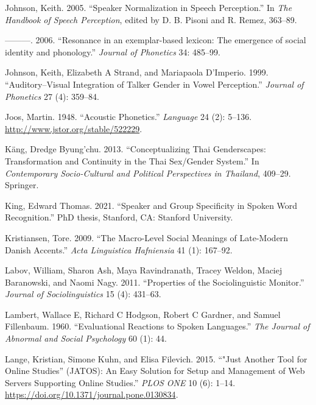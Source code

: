 \documentclass[
  letterpaper,
  DIV=11,
  numbers=noendperiod]{scrartcl}
\newlength{\cslhangindent}
\newenvironment{CSLReferences}[2] %
 {\begin{list}{}{%
  \setlength{\itemindent}{0pt}
  \setlength{\leftmargin}{0pt}
  \setlength{\parsep}{0pt}
  \ifodd #1
   \setlength{\leftmargin}{\cslhangindent}
   \setlength{\itemindent}{-1\cslhangindent}
  \fi
  \setlength{\itemsep}{#2\baselineskip}}}
 {\end{list}}
\begin{document}
\begin{CSLReferences}{1}{0}
Johnson, Keith. 2005. {``Speaker Normalization in Speech Perception.''}
In \emph{The Handbook of Speech Perception}, edited by D. B. Pisoni and
R. Remez, 363--89.

---------. 2006. {``{Resonance in an exemplar-based lexicon: The
emergence of social identity and phonology.}''} \emph{Journal of
Phonetics} 34: 485--99.

Johnson, Keith, Elizabeth A Strand, and Mariapaola D'Imperio. 1999.
{``Auditory--Visual Integration of Talker Gender in Vowel Perception.''}
\emph{Journal of Phonetics} 27 (4): 359--84.

Joos, Martin. 1948. {``Acoustic Phonetics.''} \emph{Language} 24 (2):
5--136. \url{http://www.jstor.org/stable/522229}.

Käng, Dredge Byung'chu. 2013. {``Conceptualizing Thai Genderscapes:
Transformation and Continuity in the Thai Sex/Gender System.''} In
\emph{Contemporary Socio-Cultural and Political Perspectives in
Thailand}, 409--29. Springer.

King, Edward Thomas. 2021. {``Speaker and Group Specificity in Spoken
Word Recognition.''} PhD thesis, Stanford, CA: Stanford University.

Kristiansen, Tore. 2009. {``The Macro-Level Social Meanings of
Late-Modern Danish Accents.''} \emph{Acta Linguistica Hafniensia} 41
(1): 167--92.

Labov, William, Sharon Ash, Maya Ravindranath, Tracey Weldon, Maciej
Baranowski, and Naomi Nagy. 2011. {``Properties of the Sociolinguistic
Monitor.''} \emph{Journal of Sociolinguistics} 15 (4): 431--63.

Lambert, Wallace E, Richard C Hodgson, Robert C Gardner, and Samuel
Fillenbaum. 1960. {``Evaluational Reactions to Spoken Languages.''}
\emph{The Journal of Abnormal and Social Psychology} 60 (1): 44.

Lange, Kristian, Simone Kuhn, and Elisa Filevich. 2015. {``"Just Another
Tool for Online Studies'' (JATOS): An Easy Solution for Setup and
Management of Web Servers Supporting Online Studies.''} \emph{PLOS ONE}
10 (6): 1--14. \url{https://doi.org/10.1371/journal.pone.0130834}.


\end{CSLReferences}
\end{document}
